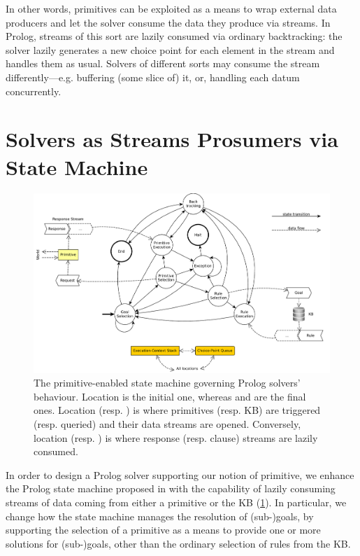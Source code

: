 \documentclass[12pt,a4paper,openright,twoside]{book}
\begin{document}
%
In other words, primitives can be exploited as a means to wrap external data producers and let the solver consume the data they produce via streams.
%
In Prolog, streams of this sort are lazily consumed via ordinary backtracking: the solver lazily generates a new choice point for each element in the stream and handles them as usual.
%
Solvers of different sorts may consume the stream differently---e.g. buffering (some slice of) it, or, handling each datum concurrently.

\section{Solvers as Streams Prosumers via State Machine}
\label{sec:state-machine}

\begin{figure}\centering
    \includegraphics[width=\linewidth]{figures/2p-fsa-dataflow}
    \caption{The primitive-enabled state machine governing Prolog solvers' behaviour. Location  is the initial one, whereas  and  are the final ones. Location  (resp. )  is where primitives (resp. KB) are triggered (resp. queried) and their data streams are opened. Conversely, location  (resp. )  is where response (resp. clause) streams are lazily consumed.}
    \label{fig:prolog-fsa}
\end{figure}

In order to design a Prolog solver supporting our notion of primitive, we enhance the Prolog state machine proposed in \cite{tuprolog-sac08} with the capability of lazily consuming streams of data coming from either a primitive or the KB (\cref{fig:prolog-fsa}).
%
In particular, we change how the state machine manages the resolution of (sub-)goals, by supporting the selection of a primitive as a means to provide one or more solutions for (sub-)goals, other than the ordinary selection of rules from the KB.
\end{document}
